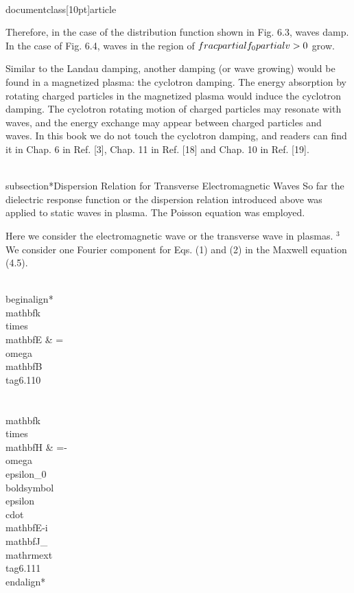 \\documentclass[10pt]{article}
\begin{document}
{{{{Therefore, in the case of the distribution function shown in Fig. 6.3, waves damp. In the case of Fig. 6.4, waves in the region of $\\frac{\\partial f_{0}}{\\partial v}>0$ grow.

Similar to the Landau damping, another damping (or wave growing) would be found in a magnetized plasma: the cyclotron damping. The energy absorption by rotating charged particles in the magnetized plasma would induce the cyclotron damping. The cyclotron rotating motion of charged particles may resonate with waves, and the energy exchange may appear between charged particles and waves. In this book we do not touch the cyclotron damping, and readers can find it in Chap. 6 in Ref. [3], Chap. 11 in Ref. [18] and Chap. 10 in Ref. [19].

\\subsection*{Dispersion Relation for Transverse Electromagnetic Waves}
So far the dielectric response function or the dispersion relation introduced above was applied to static waves in plasma. The Poisson equation was employed.

Here we consider the electromagnetic wave or the transverse wave in plasmas. ${ }^{3}$ We consider one Fourier component for Eqs. (1) and (2) in the Maxwell equation (4.5).


\\begin{align*}
\\mathbf{k} \\times \\mathbf{E} & =\\omega \\mathbf{B}  \\tag{6.110}\\\\
\\mathbf{k} \\times \\mathbf{H} & =-\\omega \\epsilon_{0} \\boldsymbol{\\epsilon} \\cdot \\mathbf{E}-i \\mathbf{J}_{\\mathrm{ext}} \\tag{6.111}
\\end{align*}


}}}}
\end{document}
